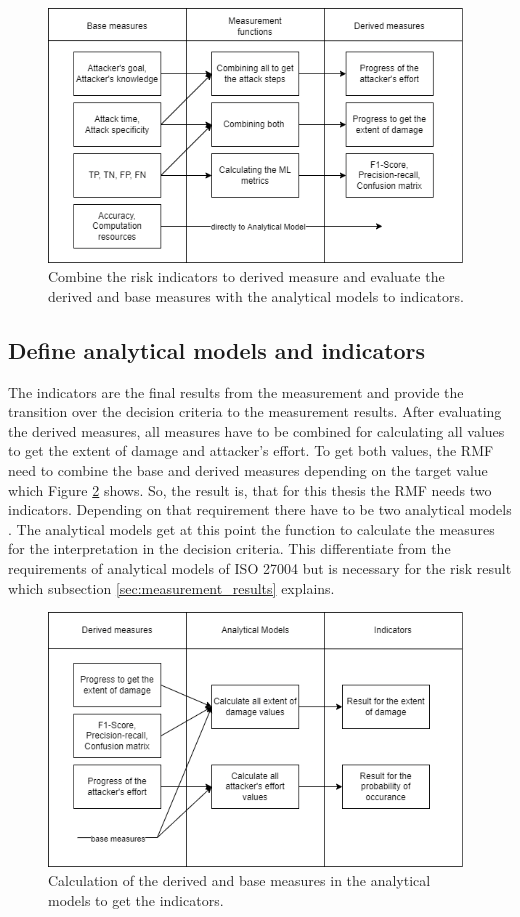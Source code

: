 \begin{figure}[ht!]
  \centering
  \includegraphics[width=11cm]{pictures/derived_measures.png}
  \caption{Combine the risk indicators to derived measure and evaluate the derived and base measures with the analytical models to indicators.}
  \label{fig:measurement_steps}
\end{figure}

\subsection{Define analytical models and indicators}

The indicators are the final results from the measurement and provide the transition over the decision criteria to the measurement results. After evaluating the derived measures, all measures have to be combined for calculating all values to get the extent of damage and attacker's effort. To get both values, the RMF need to combine the base and derived measures depending on the target value which Figure \ref{fig:indicators} shows. So, the result is, that for this thesis the RMF needs two indicators. Depending on that requirement there have to be two analytical models \cite{ISO_27004_2009}. The analytical models get at this point the function to calculate the measures for the interpretation in the decision criteria. This differentiate from the requirements of analytical models of ISO 27004 \cite{ISO_27004_2009} but is necessary for the risk result which subsection \ref{sec:measurement_results} explains.

\begin{figure}[ht!]
  \centering
  \includegraphics[width=11cm]{pictures/indicators.png}
  \caption{Calculation of the derived and base measures in the analytical models to get the indicators.}
  \label{fig:indicators}
\end{figure}

